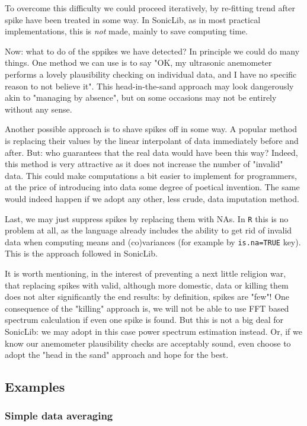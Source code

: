 \documentclass[a4paper,10pt]{book}
\begin{document}
To overcome this difficulty we could proceed iteratively, by re-fitting trend after spike have been treated in some way. In SonicLib, as in most practical implementations, this is \emph{not} made, mainly to save computing time.

Now: what to do of the sppikes we have detected? In principle we could do many things. One method we can use is to say "OK, my ultrasonic anemometer performs a lovely plausibility checking on individual data, and I have no specific reason to not believe it". This head-in-the-sand approach may look dangerously akin to "managing by absence", but on some occasions may not be entirely without any sense.

Another possible approach is to shave spikes off in some way. A popular method is replacing their values by the linear interpolant of data immediately before and after. But: who guarantees that the real data would have been this way? Indeed, this method is very attractive as it does not increase the number of "invalid" data. This could make computations a bit easier to implement for programmers, at the price of introducing into data some degree of poetical invention. The same would indeed happen if we adopt any other, less crude, data imputation method.

Last, we may just suppress spikes by replacing them with NAs. In \verb|R| this is no problem at all, as the language already includes the ability to get rid of invalid data when computing means and (co)variances (for example by \verb|is.na=TRUE| key). This is the approach followed in SonicLib.

It is worth mentioning, in the interest of preventing a next little religion war, that replacing spikes with valid, although more domestic, data or killing them does not alter significantly the end results: by definition, spikes are "few"! One consequence of the "killing" approach is, we will not be able to use FFT based spectrum calculation if even one spike is found. But this is not a big deal for SonicLib: we may adopt in this case power spectrum estimation instead. Or, if we know our anemometer plausibility checks are acceptably sound, even choose to adopt the "head in the sand" approach and hope for the best.

\subsection{Examples}
\subsubsection{Simple data averaging}
\end{document}
